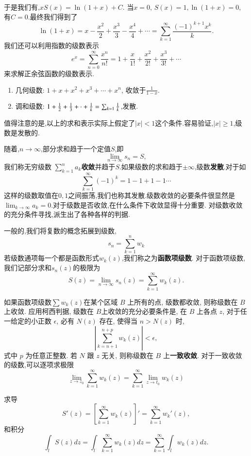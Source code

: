 于是我们有,$
    x S(x) = \ln (1 + x) + C .$
当$x=0$, $S(x) = 1, \ln (1+x) = 0$, 有$C=0$.最终我们得到了
\begin{equation}
    \ln (1+x) = x -  \frac{x^2}{2} + \frac{x^3}{3} - \frac{x^4}{4} + \cdots = \sum_{k=1}^{\infty} \frac{(-1)^{k+1} x^k}{k} .
\end{equation}
我们还可以利用指数的级数表示
\begin{equation}
    e^{x} = \sum_{n=0}^{\infty} \frac{x^n}{n!} = 1 + \frac{x}{1!} + \frac{x^2}{2!} + \frac{x^3}{3!} + \cdots 
\end{equation}
来求解正余弦函数的级数表示.
\begin{enumerate}
    \item 几何级数: $ 1 + x + x^2 + x^3 + \cdots + x^n$, 收敛于$\frac{1}{1-x}$.
    \item 调和级数: $ 1 + {\frac{1}{2}} + \frac{1}{3} + \cdot +\frac{1}{k} = \sum_{k=1} \frac{1}{k}$,发散.
\end{enumerate}

值得注意的是,以上的求和表示实际上假定了$|x|<1$这个条件.容易验证,$|x|\geq 1$,级数是发散的.

随着,$n\to \infty$,部分求和趋于一个定值$S$,即
\begin{equation}
    \lim_{n\to \infty} s_n = S ,
\end{equation}
我们称无穷级数 $\sum_{k=1}^{n} a_{k}${\bf 收敛}并趋于$S$.如果级数的求和趋于$\pm \infty$,级数{\bf 发散}.对于如
\begin{equation}
    \sum_{k=1}^{\infty} (-1)^k = 1 - 1 + 1 - 1 \cdots 
\end{equation}
这样的级数取值在$0,1$之间振荡,我们也称其发散.级数收敛的必要条件很显然是$\lim_{k\to \infty} a_k = 0$.对于级数是否收敛,在什么条件下收敛显得十分重要.
对级数收敛的充分条件寻找,派生出了各种各样的判据.

一般的,我们将复数的概念拓展到级数,
\begin{equation}
    s_n = \sum_{k=1}^{n} w_{k}
\end{equation}
若级数通项每一个都是函数形式$w_k(z)$,我们称之为\textbf{函数项级数}.
对于函数项级数,我们记部分求和$s_n(z)$的极限为
\begin{equation}
    S(z) = \lim_{n\to \infty} s_n(z) =  \sum_{k=1}^{\infty} w_k (z). 
\end{equation}


如果函数项级数$\sum w_k(z)$在某个区域 $B$ 上所有的点, 级数都收敛, 则称级数在 $B$ 上收敛. 应用柯西判据, 级数在 $B$上收敛的充分必要条件是, 在 $B$ 上各点 $z$, 对于任一给定的小正数 $\epsilon$, 必有 $N(z)$ 存在, 使得当 $n>N(z)$ 时,
$$
\left|\sum_{k=n+1}^{n+p} w_k(z)\right|<\epsilon,
$$
式中 $p$ 为任意正整数. 若 $N$ 跟 $z$ 无关, 则称级数在 $B$ 上\textbf{一致收敛}.
对于一致收敛的级数,可以逐项求极限
$$
\lim _{z \rightarrow z_0} \sum_{k=1}^{\infty} w_k(z)=\sum_{k=1}^{\infty} \lim _{z \rightarrow t_0} w_k(z)
$$

求导
$$
S' (z) = [ \sum_{k=1}^{\infty} w_k(z)]' =\sum_{k=1}^{\infty}  w_k'(z),
$$
和积分
$$
\int_l S(z) dz = \int_l \sum_{k=1}^{\infty} w_k(z) dz=\sum_{k=1}^{\infty} \int_l w_k(z) dz .
$$

